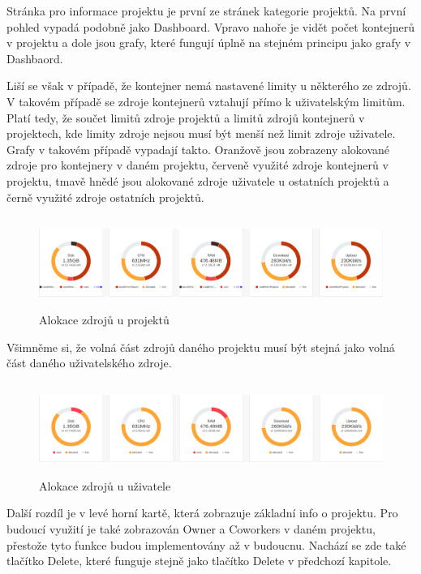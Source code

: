 \documentclass[a4paper,oneside,12pt]{report}
\begin{document}
Stránka pro informace projektu je první ze stránek kategorie projektů.
Na první pohled vypadá podobně jako Dashboard.
Vpravo nahoře je vidět počet kontejnerů v projektu a dole jsou grafy, které fungují úplně na stejném principu jako grafy v Dashbaord.

Liší se však v případě, že kontejner nemá nastavené limity u některého ze zdrojů.
V takovém případě se zdroje kontejnerů vztahují přímo k uživatelským limitům.
Platí tedy, že součet limitů zdroje projektů a limitů zdrojů kontejnerů v projektech, kde limity zdroje nejsou musí být menší než limit zdroje uživatele.
Grafy v takovém případě vypadají takto.
Oranžově jsou zobrazeny alokované zdroje pro kontejnery v daném projektu, červeně využité zdroje kontejnerů v projektu, tmavě hnědé jsou alokované zdroje uživatele u ostatních projektů a černě využité zdroje ostatních projektů.

\begin{figure}[h]
	\centering
	\includegraphics[height=3cm]{../img/graphTop.png}
	\caption[Informace o kontejneru, vlastní tvorba]{Alokace zdrojů u projektů}
	\label{fig:prographtop}
\end{figure}

Všimněme si, že volná část zdrojů daného projektu musí být stejná jako volná část daného uživatelského zdroje.

\begin{figure}[h]
	\centering
	\includegraphics[height=3cm]{../img/graphBot.png}
	\caption[Informace o kontejneru, vlastní tvorba]{Alokace zdrojů u uživatele}
	\label{fig:prographbot}
\end{figure}


Další rozdíl je v levé horní kartě, která zobrazuje základní info o projektu.
Pro budoucí využití je také zobrazován Owner a Coworkers v daném projektu, přestože tyto funkce budou implementovány až v budoucnu.
Nachází se zde také tlačítko Delete, které funguje stejně jako tlačítko Delete v předchozí kapitole.
\end{document}
